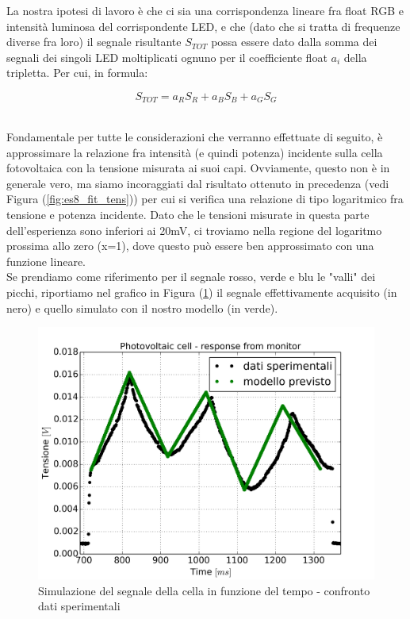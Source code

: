 \documentclass[journal, a4paper]{IEEEtran}
\begin{document}
La nostra ipotesi di lavoro è che ci sia una corrispondenza lineare fra float RGB e intensità luminosa del corrispondente LED, e che (dato che si tratta di frequenze diverse fra loro) il segnale risultante $S_{TOT}$ possa essere dato dalla somma dei segnali dei singoli LED moltiplicati ognuno per il coefficiente float $a_i$ della tripletta. Per cui, in formula:

\begin{equation}\label{sig}
S_{TOT} = a_R S_R + a_B S_B + a_G S_G
\end{equation}

~\\
Fondamentale per tutte le considerazioni che verranno effettuate di seguito, è approssimare la relazione fra intensità (e quindi potenza) incidente sulla cella fotovoltaica con la tensione misurata ai suoi capi. Ovviamente, questo non è in generale vero, ma siamo incoraggiati dal risultato ottenuto in precedenza (vedi Figura (\ref{fig:es8_fit_tens})) per cui si verifica una relazione di tipo logaritmico fra tensione e potenza incidente. Dato che le tensioni misurate in questa parte dell'esperienza sono inferiori ai 20mV, ci troviamo nella regione del logaritmo prossima allo zero (x=1), dove questo può essere ben approssimato con una funzione lineare.\\

Se prendiamo come riferimento per il segnale rosso, verde e blu le "valli" dei picchi, riportiamo nel grafico in Figura (\ref{fig:color_300_modello_lin}) il segnale effettivamente acquisito (in nero) e quello simulato con il nostro modello (in verde).\\

\begin{figure}
\centering
\includegraphics[width=0.9\linewidth]{./color_300_modello_lin}
\caption{Simulazione del segnale della cella in funzione del tempo - confronto dati sperimentali}
\label{fig:color_300_modello_lin}
\end{figure}
\end{document}
